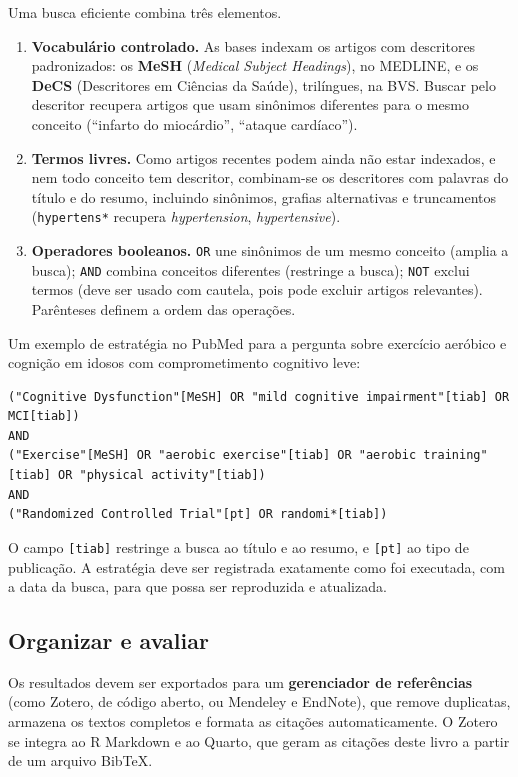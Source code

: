\documentclass[
]{book}
\providecommand{\tightlist}{%
  \setlength{\itemsep}{0pt}\setlength{\parskip}{0pt}}
\begin{document}
Uma busca eficiente combina três elementos.

\begin{enumerate}
\def\labelenumi{\arabic{enumi}.}
\tightlist
\item
  \textbf{Vocabulário controlado.} As bases indexam os artigos com descritores padronizados: os \textbf{MeSH} (\emph{Medical Subject Headings}), no MEDLINE, e os \textbf{DeCS} (Descritores em Ciências da Saúde), trilíngues, na BVS. Buscar pelo descritor recupera artigos que usam sinônimos diferentes para o mesmo conceito (``infarto do miocárdio'', ``ataque cardíaco'').
\item
  \textbf{Termos livres.} Como artigos recentes podem ainda não estar indexados, e nem todo conceito tem descritor, combinam-se os descritores com palavras do título e do resumo, incluindo sinônimos, grafias alternativas e truncamentos (\texttt{hypertens*} recupera \emph{hypertension}, \emph{hypertensive}).
\item
  \textbf{Operadores booleanos.} \texttt{OR} une sinônimos de um mesmo conceito (amplia a busca); \texttt{AND} combina conceitos diferentes (restringe a busca); \texttt{NOT} exclui termos (deve ser usado com cautela, pois pode excluir artigos relevantes). Parênteses definem a ordem das operações.
\end{enumerate}

Um exemplo de estratégia no PubMed para a pergunta sobre exercício aeróbico e cognição em idosos com comprometimento cognitivo leve:

\begin{verbatim}
("Cognitive Dysfunction"[MeSH] OR "mild cognitive impairment"[tiab] OR MCI[tiab])
AND
("Exercise"[MeSH] OR "aerobic exercise"[tiab] OR "aerobic training"[tiab] OR "physical activity"[tiab])
AND
("Randomized Controlled Trial"[pt] OR randomi*[tiab])
\end{verbatim}

O campo \texttt{{[}tiab{]}} restringe a busca ao título e ao resumo, e \texttt{{[}pt{]}} ao tipo de publicação. A estratégia deve ser registrada exatamente como foi executada, com a data da busca, para que possa ser reproduzida e atualizada.

\subsection{Organizar e avaliar}\label{organizar-e-avaliar}

Os resultados devem ser exportados para um \textbf{gerenciador de referências} (como Zotero, de código aberto, ou Mendeley e EndNote), que remove duplicatas, armazena os textos completos e formata as citações automaticamente. O Zotero se integra ao R Markdown e ao Quarto, que geram as citações deste livro a partir de um arquivo BibTeX.
\end{document}
